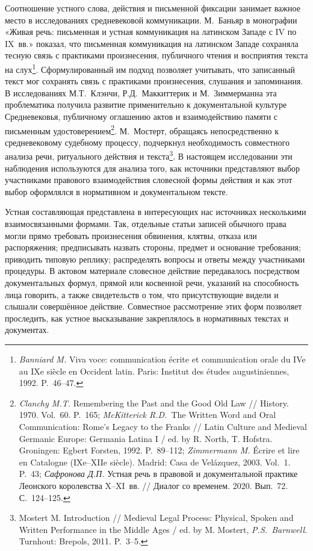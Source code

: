Соотношение устного слова, действия и письменной фиксации занимает важное место в исследованиях средневековой коммуникации. М.~Баньяр в монографии «Живая речь: письменная и устная коммуникация на латинском Западе с IV по IX~вв.» показал, что письменная коммуникация на латинском Западе сохраняла тесную связь с практиками произнесения, публичного чтения и восприятия текста на слух\footnote{\emph{Banniard M.} Viva voce: communication écrite et communication orale du IVe au IXe siècle en Occident latin. Paris: Institut des études augustiniennes, 1992. P.~46--47.}. Сформулированный им подход позволяет учитывать, что записанный текст мог сохранять связь с практиками произнесения, слушания и запоминания. В исследованиях М.Т.~Клэнчи, Р.Д.~Маккиттерик и М.~Зиммерманна эта проблематика получила развитие применительно к документальной культуре Средневековья, публичному оглашению актов и взаимодействию памяти с письменным удостоверением\footnote{\emph{Clanchy M.T. }Remembering the Past and the Good Old Law // History. 1970. Vol.~60. P.~165; \emph{McKitterick R.D.}~The Written Word and Oral Communication: Rome’s Legacy to the Franks // Latin Culture and Medieval Germanic Europe: Germania Latina I / ed. by R. North, T. Hofstra. Groningen: Egbert Forsten, 1992. P.~89--112; \emph{Zimmermann M.} Écrire et lire en Catalogne (IXe--XIIe siècle). Madrid: Casa de Velázquez, 2003. Vol.~1. P.~43; \emph{Сафронова Д.П. }Устная речь в правовой и документальной практике Леонского королевства X--XI~вв. // Диалог со временем. 2020. Вып.~72. С.~124--125.}. М.~Мостерт, обращаясь непосредственно к средневековому судебному процессу, подчеркнул необходимость совместного анализа речи, ритуального действия и текста\footnote{Mostert M. Introduction // Medieval Legal Process: Physical, Spoken and Written Performance in the Middle Ages / ed. by M. Mostert, \emph{P.S.~Barnwell}. Turnhout: Brepols, 2011. P.~3--5.}. В настоящем исследовании эти наблюдения используются для анализа того, как источники представляют выбор участниками правового взаимодействия словесной формы действия и как этот выбор оформлялся в нормативном и документальном тексте.

Устная составляющая представлена в интересующих нас источниках несколькими взаимосвязанными формами. Так, отдельные статьи записей обычного права могли прямо требовать произнесения обвинения, клятвы, отказа или распоряжения; предписывать назвать стороны, предмет и основание требования; приводить типовую реплику; распределять вопросы и ответы между участниками процедуры. В актовом материале словесное действие передавалось посредством документальных формул, прямой или косвенной речи, указаний на способность лица говорить, а также свидетельств о том, что присутствующие видели и слышали совершённое действие. Совместное рассмотрение этих форм позволяет проследить, как устное высказывание закреплялось в нормативных текстах и документах.

